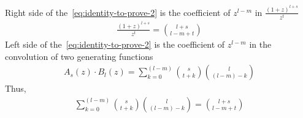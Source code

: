 ﻿\documentclass{article}
\begin{document}
    Right side of the~\eqref{eq:identity-to-prove-2} is the coefficient of
    $z^{l-m}$ in $\frac{(1+z)^{l+s}}{z^t}$
    \begin{align*}
    [z^{l-m}]
        \frac{(1+z)^{l+s}}{z^t} = \binom{l+s}{l-m+t}
    \end{align*}
    Left side of the~\eqref{eq:identity-to-prove-2} is the coefficient of $z^{l-m}$
    in the convolution of two generating functions
    \begin{align*}
    [z^{l-m}]
        A_s(z) \cdot B_l(z) = \sum_{k=0}^{(l-m)} \binom{s}{t+k} \binom{l}{(l-m)-k}
    \end{align*}
    Thus,
    \begin{align*}
        \sum_{k=0}^{(l-m)} \binom{s}{t+k} \binom{l}{(l-m)-k} = \binom{l+s}{l-m+t}
    \end{align*}
\end{document}
